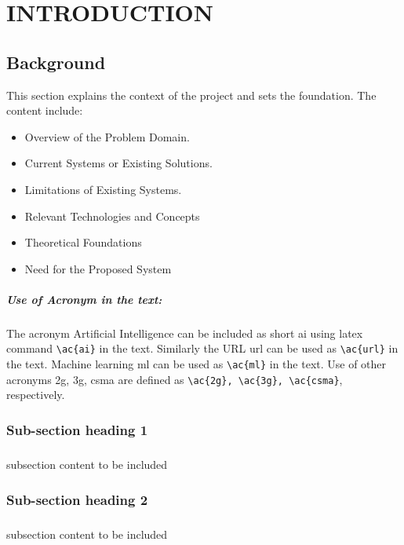 \chapter{\MakeUppercase{Introduction}}
\label{chap:introduction}
\justifying
\section{Background}
\label{sec:introduction-background}
This section explains the context of the project and sets the foundation. The content include:

\begin{itemize}
	\item Overview of the Problem Domain.
	\item Current Systems or Existing Solutions.
	\item Limitations of Existing Systems.
	\item Relevant Technologies and Concepts
	\item Theoretical Foundations
	\item Need for the Proposed System
\end{itemize}
\paragraph{Use of Acronym in the text:}The acronym Artificial Intelligence can be included as short \ac{ai} using latex command \verb|\ac{ai}|  in the text. Similarly the URL \ac{url} can be used as \verb|\ac{url}| in the text. Machine learning \ac{ml} can be used as \verb|\ac{ml}| in the text. Use of other acronyms \ac{2g}, \ac{3g}, \ac{csma} are  defined as \verb|\ac{2g}, \ac{3g}, \ac{csma}|, respectively.
\subsection{Sub-section heading 1}
\label{subsec:introduction-heading-1}
\paragraph{} subsection content to be included 

\subsection{Sub-section heading 2}
\label{subsec:introduction-heading-2}
\paragraph{} subsection content to be included 


